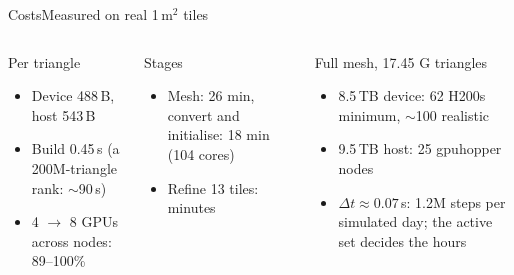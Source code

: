 \documentclass[aspectratio=169]{beamer}
\newcommand{\muted}[1]{{\footnotesize\color{cookieMuted}#1}}
\begin{document}
\begin{frame}{Costs}{Measured on real 1\,m$^2$ tiles}
  \begin{columns}[T,onlytextwidth]
      \begin{block}{Per triangle}
        \begin{itemize}
          \item Device 488\,B, host 543\,B
          \item Build 0.45\,\textmu s \muted{(a 200M-triangle rank: $\sim$90\,s)}
          \item 4 $\to$ 8 GPUs across nodes: 89--100\%
        \end{itemize}
      \end{block}
      \begin{block}{Stages}
        \begin{itemize}
          \item Mesh: 26 min, convert and initialise: 18 min \muted{(104 cores)}
          \item Refine 13 tiles: minutes
        \end{itemize}
      \end{block}
      \begin{block}{Full mesh, 17.45 G triangles}
        \begin{itemize}
          \item 8.5\,TB device: 62 H200s minimum, $\sim$100 realistic
          \item 9.5\,TB host: 25 gpuhopper nodes
          \item $\Delta t \approx 0.07$\,s: 1.2M steps per simulated day; the active set decides the hours
        \end{itemize}
      \end{block}
  \end{columns}
\end{frame}
\end{document}
